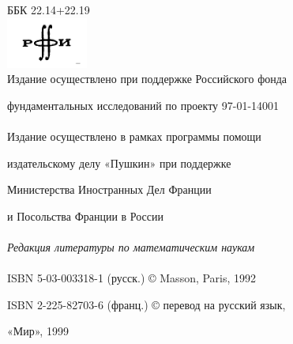 \documentclass{mai_book}
\begin{document}
\hspace{4.0in} ББК 22.14+22.19
\\

\hspace{2.4in} \includegraphics[keyval-list]{1.png}
\\

\hspace{2.0cm} Издание осуществлено при поддержке Российского фонда 

\hspace{2.3cm}фундаментальных исследований по проекту 97-01-14001
\\\\

\hspace{2.5cm} Издание осуществлено в рамках программы помощи 

\hspace{2.9cm} издательскому делу «Пушкин» при поддержке 

\hspace{3.2cm} Министерства Иностранных Дел Франции

\hspace{4.0cm} и Посольства Франции в России
\\\\
 
\hspace{2.0cm} \textit {Редакция литературы по математическим наукам}
\\\\

ISBN 5-03-003318-1 (русск.) \hspace{2.1cm} © Masson, Paris, 1992 

 ISBN 2-225-82703-6 (франц.) \hspace{2.0cm} © перевод на русский язык,
 
\hspace{2.8in} «Мир», 1999
\newpage
\end{document}
